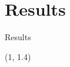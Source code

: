\documentclass[english,aspectratio=169,dvipsnames]{beamer}
\begin{document}
	 

\section{Results}

\begin{frame}{Results}{}
    \begin{textblock}{5}(1, 1.4)
        
    \end{textblock}
\end{frame}


	 
\end{document}
